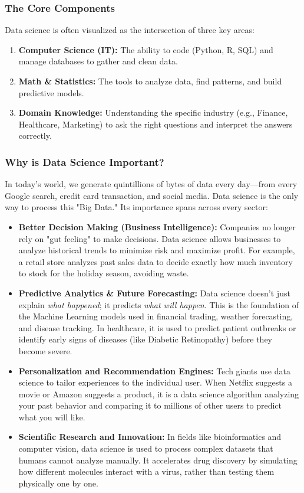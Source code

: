 \documentclass[a4paper,12pt]{article}
\begin{document}
\subsubsection*{The Core Components}
Data science is often visualized as the intersection of three key areas:
\begin{enumerate}
    \item \textbf{Computer Science (IT):} The ability to code (Python, R, SQL) and manage databases to gather and clean data.
    \item \textbf{Math \& Statistics:} The tools to analyze data, find patterns, and build predictive models.
    \item \textbf{Domain Knowledge:} Understanding the specific industry (e.g., Finance, Healthcare, Marketing) to ask the right questions and interpret the answers correctly.
\end{enumerate}

\subsubsection*{Why is Data Science Important?}
In today's world, we generate quintillions of bytes of data every day—from every Google search, credit card transaction, and social media. Data science is the only way to process this "Big Data." Its importance spans across every sector:

\begin{itemize}
    \item \textbf{Better Decision Making (Business Intelligence):} Companies no longer rely on "gut feeling" to make decisions. Data science allows businesses to analyze historical trends to minimize risk and maximize profit. For example, a retail store analyzes past sales data to decide exactly how much inventory to stock for the holiday season, avoiding waste.

    \item \textbf{Predictive Analytics \& Future Forecasting:} Data science doesn't just explain \textit{what happened}; it predicts \textit{what will happen}. This is the foundation of the Machine Learning models used in financial trading, weather forecasting, and disease tracking. In healthcare, it is used to predict patient outbreaks or identify early signs of diseases (like Diabetic Retinopathy) before they become severe.

    \item \textbf{Personalization and Recommendation Engines:} Tech giants use data science to tailor experiences to the individual user. When Netflix suggests a movie or Amazon suggests a product, it is a data science algorithm analyzing your past behavior and comparing it to millions of other users to predict what you will like.

    \item \textbf{Scientific Research and Innovation:} In fields like bioinformatics and computer vision, data science is used to process complex datasets that humans cannot analyze manually. It accelerates drug discovery by simulating how different molecules interact with a virus, rather than testing them physically one by one.
\end{itemize}
\end{document}
